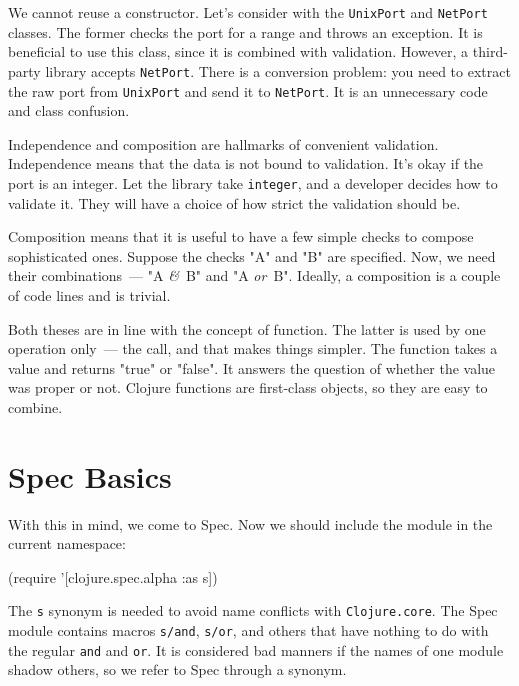 We cannot reuse a constructor. Let's consider with the \verb|UnixPort| and \verb|NetPort| classes. The former checks the port for a range and throws an exception. It is beneficial to use this class, since it is combined with validation. However, a third-party library accepts \verb|NetPort|. There is a conversion problem: you need to extract the raw port from \verb|UnixPort| and send it to \verb|NetPort|. It is an unnecessary code and class confusion.


Independence and composition are hallmarks of convenient validation. Independence means that the data is not bound to validation. It's okay if the port is an integer. Let the library take \verb|integer|, and a developer decides how to validate it. They will have a choice of how strict the validation should be.


Composition means that it is useful to have a few simple checks to compose sophisticated ones. Suppose the checks "A" and "B" are specified. Now, we need their combinations~--- "A  \emph{\&}~B" and "A \emph{or}~B". Ideally, a composition is a couple of code lines and is trivial.


Both theses are in line with the concept of function.  The latter is used by one operation only~--- the call, and that makes things simpler. The function takes a value and returns "true" or "false". It answers the question of whether the value was proper or not. Clojure functions are first-class objects, so they are easy to combine.

\section{Spec Basics}

With this in mind, we come to Spec. Now we should include the module in the current namespace:

\begin{english}
  \begin{clojure}
(require '[clojure.spec.alpha :as s])
  \end{clojure}
\end{english}

The \verb|s| synonym is needed to avoid name conflicts with \verb|Clojure.core|. The Spec module contains macros \verb|s/and|, \verb|s/or|, and others that have nothing to do with the regular \verb|and| and \verb|or|. It is considered bad manners if the names of one module shadow others, so we refer to Spec through a synonym.

